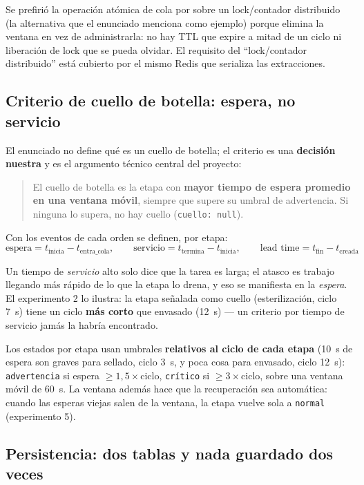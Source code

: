 \documentclass[12pt,a4paper]{article}
\begin{document}
Se prefirió la operación atómica de cola por sobre un lock/contador distribuido
(la alternativa que el enunciado menciona como ejemplo) porque elimina la
ventana en vez de administrarla: no hay TTL que expire a mitad de un ciclo ni
liberación de lock que se pueda olvidar. El requisito del ``lock/contador
distribuido'' está cubierto por el mismo Redis que serializa las extracciones.

\subsection{Criterio de cuello de botella: espera, no servicio}
\label{sec:criterio}

El enunciado no define qué es un cuello de botella; el criterio es una
\textbf{decisión nuestra} y es el argumento técnico central del proyecto:

\begin{quote}
El cuello de botella es la etapa con \textbf{mayor tiempo de espera promedio en
una ventana móvil}, siempre que supere su umbral de advertencia. Si ninguna lo
supera, no hay cuello (\texttt{cuello: null}).
\end{quote}

Con los eventos de cada orden se definen, por etapa:
\[
\text{espera} = t_{\text{inicia}} - t_{\text{entra\_cola}}, \qquad
\text{servicio} = t_{\text{termina}} - t_{\text{inicia}}, \qquad
\text{lead time} = t_{\text{fin}} - t_{\text{creada}}
\]

Un tiempo de \emph{servicio} alto solo dice que la tarea es larga; el atasco es
trabajo llegando más rápido de lo que la etapa lo drena, y eso se manifiesta en
la \emph{espera}. El experimento 2 lo ilustra: la etapa señalada como cuello
(esterilización, ciclo 7~s) tiene un ciclo \textbf{más corto} que envasado
(12~s) — un criterio por tiempo de servicio jamás la habría encontrado.

Los estados por etapa usan umbrales \textbf{relativos al ciclo de cada etapa}
(10~s de espera son graves para sellado, ciclo 3~s, y poca cosa para envasado,
ciclo 12~s): \texttt{advertencia} si espera $\geq 1{,}5\times$ciclo,
\texttt{crítico} si $\geq 3\times$ciclo, sobre una ventana móvil de 60~s. La
ventana además hace que la recuperación sea automática: cuando las esperas
viejas salen de la ventana, la etapa vuelve sola a \texttt{normal}
(experimento 5).

\subsection{Persistencia: dos tablas y nada guardado dos veces}
\end{document}

